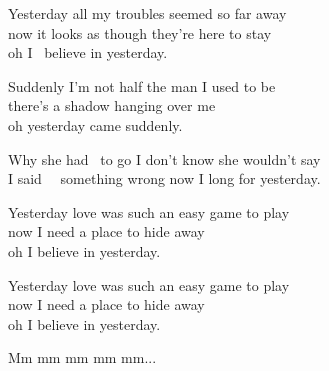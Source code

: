 
\ve{}
Yesterday all my troubles seemed so far away \\
now it looks as though they're here to stay \\
oh I \ believe in yesterday.

\ve{}
Suddenly I'm not half the man I used to be\\
there's a shadow hanging over me\\
oh yesterday came suddenly.

\cho{}
Why she \quad {}had \ to go I don't know she wouldn't say\\
I \qquad {}said \ \ something wrong now I long for yesterday.

\ve{}
Yesterday love was such an easy game to play\\
now I need a place to hide away\\
oh I believe in yesterday.

\cho{}

\ve{}
Yesterday love was such an easy game to play\\
now I need a place to hide away\\
oh I believe in yesterday.

\re{}
Mm mm mm mm mm...

\esong